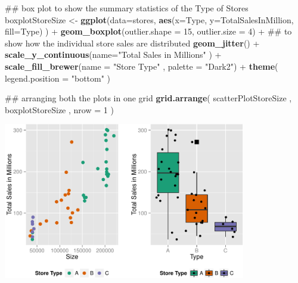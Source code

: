\documentclass[]{article}
\newenvironment{Shaded}{\begin{snugshade}}{\end{snugshade}}
\newcommand{\KeywordTok}[1]{\textcolor[rgb]{0.13,0.29,0.53}{\textbf{{#1}}}}
\newcommand{\DataTypeTok}[1]{\textcolor[rgb]{0.13,0.29,0.53}{{#1}}}
\newcommand{\DecValTok}[1]{\textcolor[rgb]{0.00,0.00,0.81}{{#1}}}
\newcommand{\StringTok}[1]{\textcolor[rgb]{0.31,0.60,0.02}{{#1}}}
\newcommand{\NormalTok}[1]{{#1}}
\begin{document}
\begin{Shaded}
\begin{Highlighting}[]
\NormalTok{## box plot to show the summary statistics of the Type of Stores}
\NormalTok{boxplotStoreSize <-}\StringTok{ }\KeywordTok{ggplot}\NormalTok{(}\DataTypeTok{data=}\NormalTok{stores, }
       \KeywordTok{aes}\NormalTok{(}\DataTypeTok{x=}\NormalTok{Type, }\DataTypeTok{y=}\NormalTok{TotalSalesInMillion, }\DataTypeTok{fill=}\NormalTok{Type) ) +}\StringTok{ }
\StringTok{  }\KeywordTok{geom_boxplot}\NormalTok{(}\DataTypeTok{outlier.shape =} \DecValTok{15}\NormalTok{, }\DataTypeTok{outlier.size =} \DecValTok{4}\NormalTok{) +}
\StringTok{  }\NormalTok{## to show how the individual store sales are distributed}
\StringTok{  }\KeywordTok{geom_jitter}\NormalTok{() +}
\StringTok{  }\KeywordTok{scale_y_continuous}\NormalTok{(}\DataTypeTok{name=}\StringTok{"Total Sales in Millions"} \NormalTok{) +}
\StringTok{  }\KeywordTok{scale_fill_brewer}\NormalTok{(}\DataTypeTok{name =} \StringTok{"Store Type"} \NormalTok{, }\DataTypeTok{palette =} \StringTok{"Dark2"}\NormalTok{) +}
\StringTok{  }\KeywordTok{theme}\NormalTok{( }\DataTypeTok{legend.position =} \StringTok{"bottom"} \NormalTok{)}
\end{Highlighting}
\end{Shaded}

\begin{Shaded}
\begin{Highlighting}[]
\NormalTok{## arranging both the plots in one grid}
\KeywordTok{grid.arrange}\NormalTok{( scatterPlotStoreSize , boxplotStoreSize , }\DataTypeTok{nrow =} \DecValTok{1} \NormalTok{)}
\end{Highlighting}
\end{Shaded}

\includegraphics[width=400px]{PredictingWeeklySalesAtWalmart_files/figure-latex/storeTypeScatterBoxGrid-1}
\end{document}
